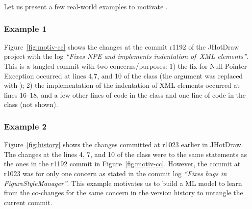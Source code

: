 
Let us present a few real-world examples to motivate {\tool}.

\vspace{-6pt}
\subsubsection{Example 1}
\label{sec:example-1}

Figure~\ref{fig:motiv-cc} shows the changes at the commit r1192 of the
JHotDraw project with the log {\em ``Fixes NPE and implements
  indentation of~XML elements''}. This is a tangled commit with two
concerns/purposes: 1) the fix for Null Pointer Exception occurred at
lines 4,7, and 10 of the  class (the 
argument was replaced with ); 2) the
implementation of the indentation of XML elements occurred at lines
16--18, and a few other lines of code in the  class
and one line of code in the  class (not shown).

\subsubsection{Example 2}

Figure~\ref{fig:history} shows the changes committed at r1023 earlier
in JHotDraw. The changes at the lines 4, 7, and 10 of the
 class were to the same statements as the ones in the
r1192 commit in Figure~\ref{fig:motiv-cc}. However, the commit at
r1023 was for only one concern as stated in the commit log {\em
  ``Fixes bugs in FigureStyleManager''}. This example motivates us to
build a ML model to learn from the co-changes for the same concern in
the version history to untangle the current commit.


